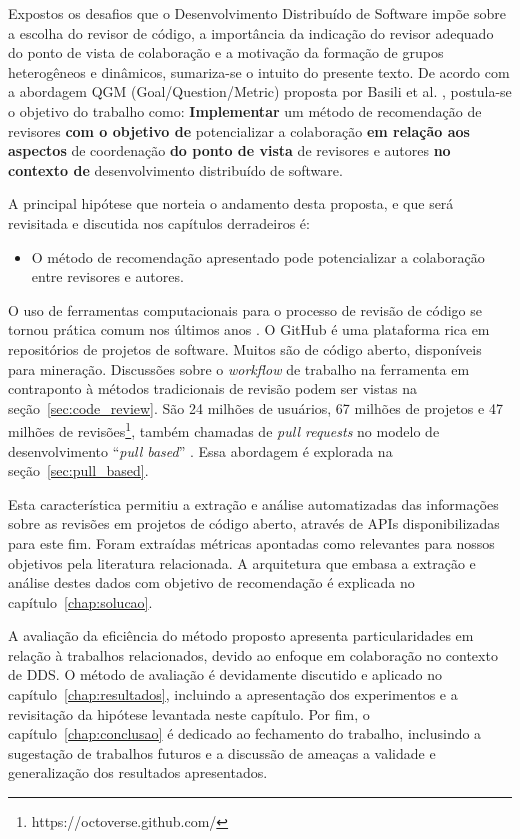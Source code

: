 \documentclass[12pt,openany,oneside,a4paper,english,brazil]{abntbibufjf}
\begin{document}
  Expostos os desafios que o Desenvolvimento Distribuído de Software impõe sobre a escolha do revisor de código, a importância da indicação do revisor adequado do ponto de vista de colaboração e a motivação da formação de grupos heterogêneos e dinâmicos, sumariza-se o intuito do presente texto. De acordo com a abordagem QGM (Goal/Question/Metric) proposta por Basili et al. \cite{Basili1984}, postula-se o objetivo do trabalho como:  \textbf{Implementar} um método de recomendação de revisores \textbf{com o objetivo de} potencializar a colaboração \textbf{em relação aos aspectos} de coordenação \textbf{do ponto de vista} de revisores e autores \textbf{no contexto de} desenvolvimento distribuído de software.

  A principal hipótese que norteia o andamento desta proposta, e que será revisitada e discutida nos capítulos derradeiros é:

  \begin{itemize}
    \item O método de recomendação apresentado pode potencializar a colaboração entre revisores e autores.
  \end{itemize}

  O uso de ferramentas computacionais para o processo de revisão de código se tornou prática comum nos últimos anos \cite{Bacchelli2013}. O GitHub é uma plataforma rica em repositórios de projetos de software. Muitos são de código aberto, disponíveis para mineração. Discussões sobre o \textit{workflow} de trabalho na ferramenta em contraponto à métodos tradicionais de revisão podem ser vistas na seção~\ref{sec:code_review}. São 24 milhões de usuários, 67 milhões de projetos e 47 milhões de revisões\footnote{https://octoverse.github.com/}, também chamadas de \textit{pull requests} no modelo de desenvolvimento ``\textit{pull based}'' \cite{gousios2014}. Essa abordagem é explorada na seção~\ref{sec:pull_based}.

  Esta característica permitiu a extração e análise automatizadas das informações sobre as revisões em projetos de código aberto, através de APIs disponibilizadas para este fim. Foram extraídas métricas apontadas como relevantes para nossos objetivos pela literatura relacionada. A arquitetura que embasa a extração e análise destes dados com objetivo de recomendação é explicada no capítulo~\ref{chap:solucao}.

  A avaliação da eficiência do método proposto apresenta particularidades em relação à trabalhos relacionados, devido ao enfoque em colaboração no contexto de DDS. O método de avaliação é devidamente discutido e aplicado no capítulo~\ref{chap:resultados}, incluindo a apresentação dos experimentos e a revisitação da hipótese levantada neste capítulo. Por fim, o capítulo~\ref{chap:conclusao} é dedicado ao fechamento do trabalho, inclusindo a sugestação de trabalhos futuros e a discussão de ameaças a validade e generalização dos resultados apresentados.
\end{document}
